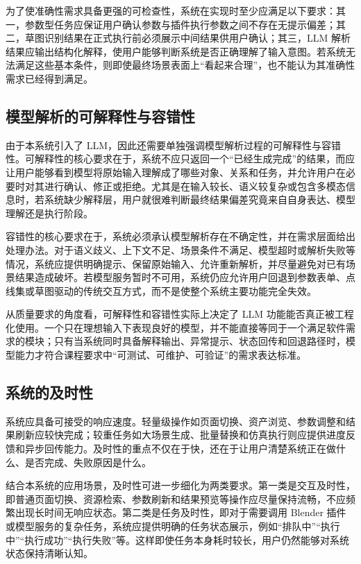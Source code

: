 \documentclass[UTF8,a4paper,10pt]{ctexart}
\begin{document}
为了使准确性需求具备更强的可检查性，系统在实现时至少应满足以下要求：其一，参数型任务应保证用户确认参数与插件执行参数之间不存在无提示偏差；其二，草图识别结果在正式执行前必须展示中间结果供用户确认；其三，LLM 解析结果应输出结构化解释，使用户能够判断系统是否正确理解了输入意图。若系统无法满足这些基本条件，则即使最终场景表面上“看起来合理”，也不能认为其准确性需求已经得到满足。

\subsection{模型解析的可解释性与容错性}
由于本系统引入了 LLM，因此还需要单独强调模型解析过程的可解释性与容错性。可解释性的核心要求在于，系统不应只返回一个“已经生成完成”的结果，而应让用户能够看到模型将原始输入理解成了哪些对象、关系和任务，并允许用户在必要时对其进行确认、修正或拒绝。尤其是在输入较长、语义较复杂或包含多模态信息时，若系统缺少解释层，用户就很难判断最终结果偏差究竟来自自身表达、模型理解还是执行阶段。

容错性的核心要求在于，系统必须承认模型解析存在不确定性，并在需求层面给出处理办法。对于语义歧义、上下文不足、场景条件不满足、模型超时或解析失败等情况，系统应提供明确提示、保留原始输入、允许重新解析，并尽量避免对已有场景结果造成破坏。若模型服务暂时不可用，系统仍应允许用户回退到参数表单、点线集或草图驱动的传统交互方式，而不是使整个系统主要功能完全失效。

从质量要求的角度看，可解释性和容错性实际上决定了 LLM 功能能否真正被工程化使用。一个只在理想输入下表现良好的模型，并不能直接等同于一个满足软件需求的模块；只有当系统同时具备解释输出、异常提示、状态回传和回退路径时，模型能力才符合课程要求中“可测试、可维护、可验证”的需求表达标准。

\subsection{系统的及时性}
系统应具备可接受的响应速度。轻量级操作如页面切换、资产浏览、参数调整和结果刷新应较快完成；较重任务如大场景生成、批量替换和仿真执行则应提供进度反馈和异步回传能力。及时性的重点不仅在于快，还在于让用户清楚系统正在做什么、是否完成、失败原因是什么。

结合本系统的应用场景，及时性可进一步细化为两类要求。第一类是交互及时性，即普通页面切换、资源检索、参数刷新和结果预览等操作应尽量保持流畅，不应频繁出现长时间无响应状态。第二类是任务及时性，即对于需要调用 Blender 插件或模型服务的复杂任务，系统应提供明确的任务状态展示，例如“排队中”“执行中”“执行成功”“执行失败”等。这样即使任务本身耗时较长，用户仍然能够对系统状态保持清晰认知。
\end{document}
